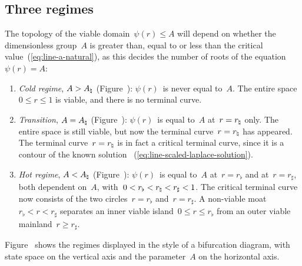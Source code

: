 \subsection{Three regimes}
\label{sec:polar.viable.regimes}

The topology of the viable domain~$\psi (r) \le A$ will depend
on whether the dimensionless group~$A$ is
greater than, equal to or less than
the critical value~(\ref{eq:line-a-natural}),
as this decides the number of roots of the equation~$\psi (r) = A$:
\begin{enumerate}
  \item
    \emph{Cold regime}, $A > A_\natural$ (Figure~\tbd):
    $\psi (r)$~is never equal to~$A$.
    The entire space~$0 \le r \le 1$ is viable,
    and there is no terminal curve.
  \item
    \emph{Transition}, $A = A_\natural$ (Figure~\tbd):
    $\psi (r)$~is equal to~$A$ at~$r = r_\natural$ only.
    The entire space is still viable,
    but now the terminal curve~$r = r_\natural$ has appeared.
    The terminal curve~$r = r_\natural$ is in fact a critical terminal curve,
    since it is a contour of the known solution~%
      (\ref{eq:line-scaled-laplace-solution}).
  \item
    \emph{Hot regime}, $A < A_\natural$ (Figure~\tbd):
    $\psi (r)$~is equal to~$A$ at~$r = r_\flat$
    and at~$r = r_\sharp$,
    both dependent on~$A$,
    with~$0 <  r_\flat < r_\natural < r_\sharp < 1$.
    The critical terminal curve now consists of
    the two circles~$r = r_\flat$ and~$r = r_\sharp$.
    A non-viable moat~$r_\flat < r < r_\sharp$
    separates an inner viable island~$0 \le r \le r_\flat$
    from an outer viable mainland~$r \ge r_\sharp$.
\end{enumerate}
Figure~\tbd{}
shows the regimes displayed in the style of a bifurcation diagram,
with state space on the vertical axis
and the parameter~$A$ on the horizontal axis.

